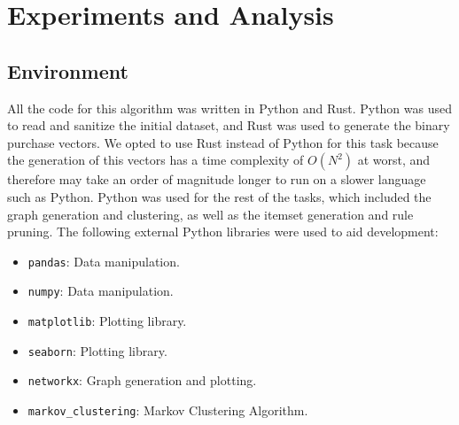 \chapter{Experiments and Analysis}

\section{Environment}
All the code for this algorithm was written in Python and Rust. Python was used to read and sanitize the initial dataset, and Rust was used to generate the binary purchase vectors. We opted to use Rust instead of Python for this task because the generation of this vectors has a time complexity of $O(N^2)$ at worst, and therefore may take an order of magnitude longer to run on a slower language such as Python. Python was used for the rest of the tasks, which included the graph generation and clustering, as well as the itemset generation and rule pruning. The following external Python libraries were used to aid development:
\begin{itemize}
\item \texttt{pandas}: Data manipulation.
\item \texttt{numpy}: Data manipulation.
\item \texttt{matplotlib}: Plotting library.
\item \texttt{seaborn}: Plotting library.
\item \texttt{networkx}: Graph generation and plotting.
\item \texttt{markov\_clustering}: Markov Clustering Algorithm.
\end{itemize}


